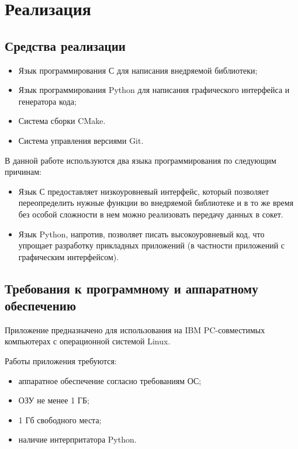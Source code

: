 \chapter{Реализация}

\section{Средства реализации}

\begin{itemize}
	\item Язык программирования С для написания внедряемой библиотеки;
	\item Язык программирования Python для написания графического интерфейса и
		генератора кода;
	\item Система сборки CMake.
	\item Система управления версиями Git.
\end{itemize}

В данной работе используются два языка программирования по следующим причинам:

\begin{itemize}
	\item Язык С предоставляет низкоуровневый интерфейс, который позволяет
		переопределить нужные функции во внедряемой библиотеке и в то же время
		без особой сложности в нем можно реализовать передачу данных в сокет.
	\item Язык Python, напротив, позволяет писать высокоуровневый код, что
		упрощает разработку прикладных приложений (в частности приложений с
		графическим интерфейсом).
\end{itemize}

\section{Требования к программному и аппаратному обеспечению}

Приложение предназначено для использования на IBM PC-совместимых компьютерах с
операционной системой Linux.

Работы приложения требуются:

\begin{itemize}
	\item аппаратное обеспечение согласно требованиям ОС;
	\item ОЗУ не менее 1 ГБ;
	\item 1 Гб свободного места;
	\item наличие интерпритатора Python.
\end{itemize}

